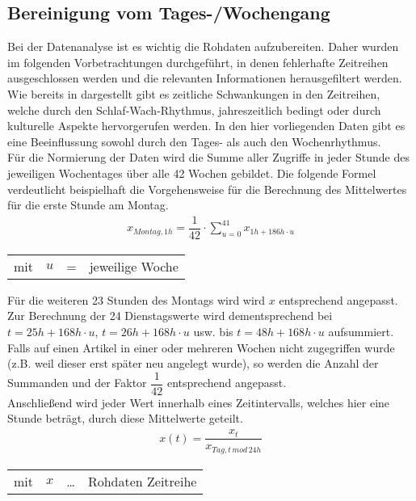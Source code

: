 \documentclass[fontsize=11pt, twoside, a4paper]{scrartcl}
\begin{document}
\subsection{Bereinigung vom Tages-/Wochengang}
\label{sec:St7}
Bei der Datenanalyse ist es wichtig die Rohdaten aufzubereiten. Daher wurden im folgenden Vorbetrachtungen durchgeführt, in denen fehlerhafte Zeitreihen ausgeschlossen werden und die relevanten Informationen herausgefiltert werden.\\
Wie bereits in \cite{CircadianPatterns} dargestellt gibt es zeitliche Schwankungen in den Zeitreihen, welche durch den Schlaf-Wach-Rhythmus, jahreszeitlich bedingt oder durch kulturelle Aspekte hervorgerufen werden. In den hier vorliegenden Daten gibt es eine Beeinflussung sowohl durch den Tages- als auch den Wochenrhythmus.\\
Für die Normierung der Daten wird die Summe aller Zugriffe in jeder Stunde des jeweiligen Wochentages über alle 42 Wochen gebildet. Die folgende Formel verdeutlicht beispielhaft die Vorgehensweise für die Berechnung des Mittelwertes für die erste Stunde am Montag.
\begin{align}
x_{Montag,1h}= \displaystyle \dfrac{1}{42} \cdot \sum_{u=0}^{41} x_{1h+186h\cdot u}
\label{Wochengang1}
\end{align}
\begin{table}[H]
\begin{tabular}{rccl}
mit  & $u$ & = & jeweilige Woche\\
\end{tabular}
\end{table}
Für die weiteren 23 Stunden des Montags wird wird $x$ entsprechend angepasst. Zur Berechnung der 24 Dienstagswerte wird dementsprechend bei $t=25h+168h\cdot u$, $t=26h+168h\cdot u$ usw. bis $t=48h+168h\cdot u$ aufsummiert. Falls auf einen Artikel in einer oder mehreren Wochen nicht zugegriffen wurde (z.B. weil dieser erst später neu angelegt wurde), so werden die Anzahl der Summanden und der Faktor $\dfrac{1}{42}$ entsprechend angepasst.\\
Anschließend wird jeder Wert innerhalb eines Zeitintervalls, welches hier eine Stunde beträgt, durch diese Mittelwerte geteilt.
\begin{align}
x(t) = \dfrac{x_{t}}{x_{Tag,t\, mod\, 24h}}
\label{Wochengang2}
\end{align}
\begin{table}[H]
\begin{tabular}{rccl}
mit  & $x$ & \ldots & Rohdaten Zeitreihe\\
\end{tabular}
\end{table}
\end{document}
